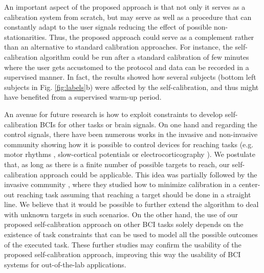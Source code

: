 An important aspect of the proposed approach is that not only it serves as a calibration system from scratch, but may serve as well as a procedure that can constantly adapt to the user signals reducing the effect of possible non-stationarities. Thus, the proposed approach could serve as a complement rather than an alternative to standard calibration approaches. For instance, the self-calibration algorithm could be run after a standard calibration of few minutes where the user gets accustomed to the protocol and data can be recorded in a supervised manner. In fact, the results showed how several subjects (bottom left subjects in Fig. \ref{fig:labels}b) were affected by the self-calibration, and thus might have benefited from a supervised warm-up period.

An avenue for future research is how to exploit constraints to develop self-calibration BCIs for other tasks or brain signals. 	On one hand and regarding the control signals, there have been numerous works in the invasive and non-invasive community showing how it is possible to control devices for reaching tasks (e.g. motor rhythms \cite{mcfarland2010electroencephalographic}, slow-cortical potentials \cite{birbaumer1999spelling} or electrocorticography \cite{schalk2008two}). We postulate that, as long as there is a finite number of possible targets to reach, our self-calibration approach could be applicable. This idea was partially followed by the invasive community \cite{Orsborn12, orsborn2014closed}, where they studied how to minimize calibration in a center-out reaching task assuming that reaching a target should be done in a straight line. We believe that it would be possible to further extend the algorithm to deal with unknown targets in such scenarios. 
%
On the other hand, the use of our proposed self-calibration approach on other BCI tasks solely depends on the existence of task constraints that can be used to model all the possible outcomes of the executed task.
%
These further studies may confirm the usability of the proposed self-calibration approach, improving this way the usability of BCI systems for out-of-the-lab applications.

